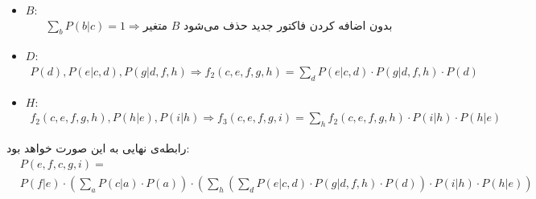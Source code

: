 \begin{ابجد}
\begin{itemize}
    \item \textbf{$B$}:
          \begin{align*}
              \sum_b P(b|c) = 1 \Rightarrow \text{متغیر $B$ بدون اضافه کردن فاکتور جدید حذف می‌شود}
          \end{align*}

    \item \textbf{$D$}:
          \begin{align*}
              P(d), P(e|c,d), P(g|d,f,h) \Rightarrow f_2(c,e,f,g,h) = \sum_d P(e|c,d) \cdot P(g|d,f,h) \cdot P(d)
          \end{align*}

    \item \textbf{$H$}:
          \begin{align*}
              f_2(c,e,f,g,h), P(h|e), P(i|h) \Rightarrow f_3(c,e,f,g,i) = \sum_h f_2(c,e,f,g,h) \cdot P(i|h) \cdot P(h|e)
          \end{align*}
\end{itemize}

رابطه‌ی نهایی به این صورت خواهد بود:
\begin{align*}
     & P(e, f, c, g, i) =                                                                                                                                              \\
     & P(f|e) \cdot \left(\sum_a P(c|a) \cdot P(a)\right) \cdot \left(\sum_h \left(\sum_d P(e|c,d) \cdot P(g|d,f,h) \cdot P(d)\right) \cdot P(i|h) \cdot P(h|e)\right)
\end{align*}

\end{ابجد}